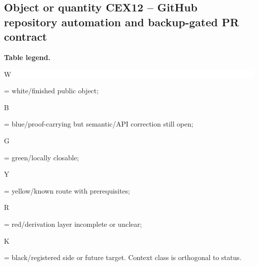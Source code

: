 \subsection*{Object or quantity CEX12 -- GitHub repository automation and backup-gated PR contract}
\hypertarget{objproof:CEX12}{}
\par\smallskip\noindent\begin{minipage}{0.99\linewidth}\footnotesize\raggedright\textbf{Table legend.} \colorbox{white}{\strut W} = white/finished public object; \colorbox{cyan!20}{\strut B} = blue/proof-carrying but semantic/API correction still open; \colorbox{green!18}{\strut G} = green/locally closable; \colorbox{yellow!25}{\strut Y} = yellow/known route with prerequisites; \colorbox{red!20}{\strut R} = red/derivation layer incomplete or unclear; \colorbox{black!18}{\strut K} = black/registered side or future target. Context class is orthogonal to status.\end{minipage}\par\vspace{0.25em}
